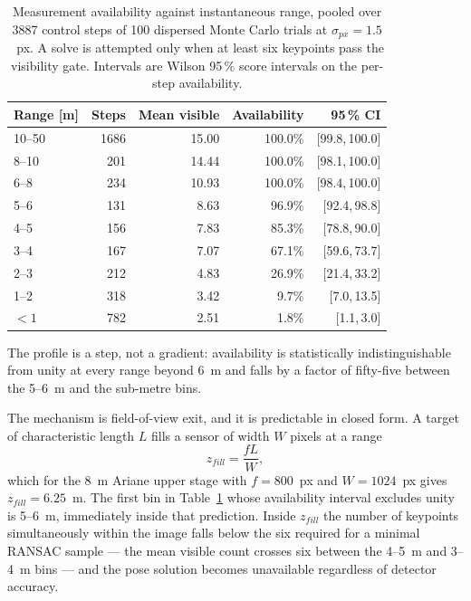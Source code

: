 \begin{table}[!tb]
\caption{Measurement availability against instantaneous range, pooled over
3887 control steps of 100 dispersed Monte Carlo trials at
$\sigma_{px} = 1.5$~px. A solve is attempted only when at least six keypoints
pass the visibility gate. Intervals are Wilson 95\,\% score intervals on the
per-step availability.}
\label{tab:dropout}
\centering
\begin{tabular}{lrrrr}
\hline
Range [m] & Steps & Mean visible & Availability & 95\,\% CI \\
\hline
10--50   & 1686 & 15.00 & 100.0\% & [99.8,\,100.0] \\
8--10    & 201 & 14.44 & 100.0\% & [98.1,\,100.0] \\
6--8     & 234 & 10.93 & 100.0\% & [98.4,\,100.0] \\
5--6     & 131 &  8.63 &  96.9\% & [92.4,\,98.8] \\
4--5     & 156 &  7.83 &  85.3\% & [78.8,\,90.0] \\
3--4     & 167 &  7.07 &  67.1\% & [59.6,\,73.7] \\
2--3     & 212 &  4.83 &  26.9\% & [21.4,\,33.2] \\
1--2     & 318 &  3.42 &   9.7\% & [7.0,\,13.5] \\
$<1$     & 782 &  2.51 &   1.8\% & [1.1,\,3.0] \\
\hline
\end{tabular}
\end{table}

The profile is a step, not a gradient: availability is statistically
indistinguishable from unity at every range beyond 6~m and falls by a factor
of fifty-five between the 5--6~m and the sub-metre bins.

The mechanism is field-of-view exit, and it is predictable in closed form. A
target of characteristic length $L$ fills a sensor of width $W$ pixels at a
range
\begin{equation}
z_{fill} = \frac{f L}{W},
\label{eq:zfill}
\end{equation}
which for the 8~m Ariane upper stage with $f = 800$~px and $W = 1024$~px gives
$z_{fill} = 6.25$~m. The first bin in Table~\ref{tab:dropout} whose
availability interval excludes unity is 5--6~m, immediately inside that
prediction. Inside $z_{fill}$ the number of keypoints simultaneously within the
image falls below the six required for a minimal RANSAC sample --- the mean
visible count crosses six between the 4--5~m and 3--4~m bins --- and the pose
solution becomes unavailable regardless of detector accuracy.

